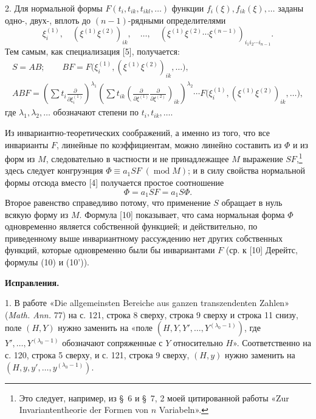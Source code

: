 \documentclass[11pt]{article}
\providecommand{\p}{\partial}
\providecommand{\modu}[1]{\;(\operatorname{mod} #1)}
\begin{document}
2. Для нормальной формы \(F(t_i,t_{ik},t_{ikl},\ldots)\) функции \(f_i(\xi),f_{ik}(\xi),\ldots\) заданы одно-, двух-, вплоть до \((n-1)\)-рядными определителями
\[
        \xi_i^{(1)},\quad (\xi^{(1)}\xi^{(2)})_{ik},\quad\ldots,\quad
        (\xi^{(1)}\xi^{(2)}\cdots\xi^{(n-1)})_{i_1i_2\cdots i_{n-1}}.
\]
Тем самым, как специализация [5], получается:
\[
\begin{gathered}
        S=AB;\qquad
        BF=F\bigl(\xi_i^{(1)},(\xi^{(1)}\xi^{(2)})_{ik},\ldots\bigr),\\
        ABF=\left(\sum t_i\frac{\p}{\p\xi_i^{(1)}}\right)^{\lambda_1}
        \left(\sum t_{ik}\left(\frac{\p}{\p\xi^{(1)}}\frac{\p}{\p\xi^{(2)}}\right)_{ik}\right)^{\lambda_2}
        \cdots F\bigl(\xi_i^{(1)},(\xi^{(1)}\xi^{(2)})_{ik},\ldots\bigr),
\end{gathered}
\]
где \(\lambda_1,\lambda_2,\ldots\) обозначают степени по \(t_i,t_{ik},\ldots\).

Из инвариантно-теоретических соображений, а именно из того, что все инварианты \(F\), линейные по коэффициентам, можно линейно составить из \(\Phi\) и из форм из \(M\), следовательно в частности и не принадлежащее \(M\) выражение \(SF\),\footnote{Это следует, например, из \S~6 и \S~7, 2 моей цитированной работы «Zur Invariantentheorie der Formen von \(n\) Variabeln».} здесь следует конгруэнция \(\Phi\equiv a_1SF\modu{M}\); и в силу свойства нормальной формы отсюда вместо [4] получается простое соотношение
\begin{equation}
        \Phi=a_1SF=a_1S\Phi.
\tag{10}
\end{equation}
Второе равенство справедливо потому, что применение \(S\) обращает в нуль всякую форму из \(M\). Формула [10] показывает, что сама нормальная форма \(\Phi\) одновременно является собственной функцией; и действительно, по приведенному выше инвариантному рассуждению нет других собственных функций, которые одновременно были бы инвариантами \(F\) (ср. к [10] Дерейтс, формулы (10) и (10')).

\begin{center}
\textbf{Исправления.}
\end{center}

1. В работе «Die allgemeinsten Bereiche aus ganzen transzendenten Zahlen» (\emph{Math. Ann.} 77) на с. 121, строка 8 сверху, строка 9 сверху и строка 11 снизу, поле \((H,Y)\) нужно заменить на «поле \((H,Y,Y',\ldots,Y^{(\lambda_0-1)})\), где \(Y',\ldots,Y^{(\lambda_0-1)}\) обозначают сопряженные с \(Y\) относительно \(H\)». Соответственно на с. 120, строка 5 сверху, и с. 121, строка 9 сверху, \((H,y)\) нужно заменить на \((H,y,y',\ldots,y^{(\lambda_0-1)})\).
\end{document}
